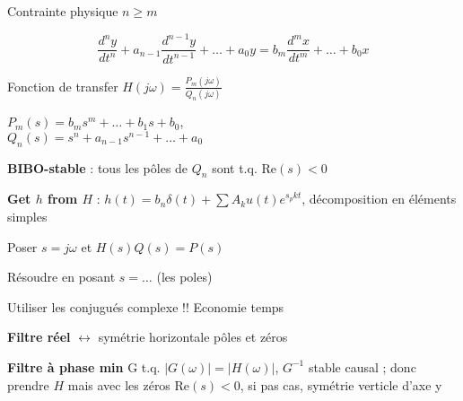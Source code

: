 Contrainte physique $n \geq m$

$$\frac{d^ny}{dt^n} + a_{n-1}\frac{d^{n-1}y}{dt^{n-1}} + \dots + a_0 y = b_m \frac{d^mx}{dt^m} + \dots + b_0 x$$

Fonction de transfer $H(j\omega) = \frac{P_m(j\omega)}{Q_n(j\omega)}$

$P_m(s) = b_ms^m+\dots+b_1s+b_0$, \\
$Q_n(s) = s^n+a_{n-1}s^{n-1}+\dots+a_0$

\textbf{BIBO-stable} : tous les pôles de $Q_n$ sont t.q. $\text{Re}(s) < 0$

\textbf{Get $h$ from $H$} : $h(t) = b_n \delta(t) + \sum A_k u(t) e^{s_p k t}$, décomposition en éléments simples

\begin{enum}
    \item Poser $s=j\omega$ et $H(s)Q(s) = P(s)$
    \item Résoudre en posant $s = \dots$ (les poles)
    \item Utiliser les conjugués complexe !! Economie temps
\end{enum}

\textbf{Filtre réel} $\leftrightarrow$ symétrie horizontale pôles et zéros 


\textbf{Filtre à phase min} G t.q. $|G(\omega)| = |H(\omega)|$, $G^{-1}$ stable causal ; donc prendre $H$ mais avec les zéros $\text{Re}(s) < 0$, si pas cas, symétrie verticle d'axe y
